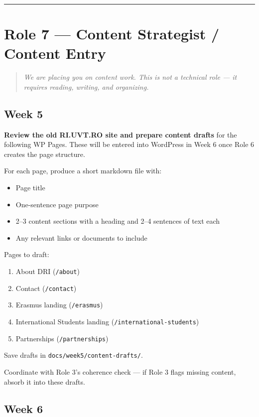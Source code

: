 \documentclass[11pt,a4paper]{article}
\newcommand{\grouprule}{\vspace{0.3em}\textcolor{ruleLine}{\rule{\linewidth}{0.4pt}}\vspace{0.3em}}
\begin{document}
\grouprule

\section{Role 7 — Content Strategist / Content Entry}

\begin{quote}\itshape
We are placing you on content work. This is not a technical role — it requires reading, writing, and organizing.
\end{quote}

\subsection{Week 5}

\textbf{Review the old RI.UVT.RO site and prepare content drafts} for the following WP Pages. These will be entered into WordPress in Week 6 once Role 6 creates the page structure.

For each page, produce a short markdown file with:
\begin{itemize}
\item Page title
\item One-sentence page purpose
\item 2–3 content sections with a heading and 2–4 sentences of text each
\item Any relevant links or documents to include
\end{itemize}

Pages to draft:
\begin{enumerate}
\item About DRI (\nolinkurl{/about})
\item Contact (\nolinkurl{/contact})
\item Erasmus landing (\nolinkurl{/erasmus})
\item International Students landing (\nolinkurl{/international-students})
\item Partnerships (\nolinkurl{/partnerships})
\end{enumerate}

Save drafts in \nolinkurl{docs/week5/content-drafts/}.

Coordinate with Role 3's coherence check — if Role 3 flags missing content, absorb it into these drafts.

\subsection{Week 6}
\end{document}
